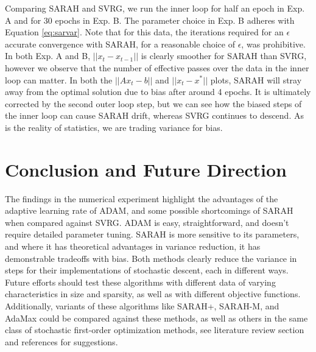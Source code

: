 \documentclass[letterpaper,11 pt]{article}
\begin{document}
Comparing SARAH and SVRG, we run the inner loop for half an epoch  in Exp. A and for 30 epochs in Exp. B.  The parameter choice in Exp. B adheres with Equation \ref{eq:sarvar}. Note that for this data, the iterations required for an $\epsilon$ accurate convergence with SARAH, for a reasonable choice of $\epsilon$, was prohibitive. In both Exp. A and B, $||x_t - x_{t-1}||$ is clearly smoother for SARAH than SVRG, however we observe that the number of effective passes over the data in the inner loop can matter. In both the $||Ax_t-b||$ and $||x_t-x^*||$ plots, SARAH will stray away from the optimal solution due to bias after around 4 epochs.  It is ultimately corrected by the second outer loop step, but we can see how the biased steps of the inner loop can cause SARAH drift, whereas SVRG continues to descend. As is the reality of statistics, we are trading variance for bias.


\section{Conclusion and Future Direction}
The findings in the numerical experiment highlight the advantages of the adaptive learning rate of ADAM, and some possible shortcomings of SARAH when compared against SVRG. ADAM is easy, straightforward, and doesn't require detailed parameter tuning. SARAH is more sensitive to its parameters, and where it has theoretical advantages in variance reduction, it has demonstrable tradeoffs with bias. Both methods clearly reduce the variance in steps for their implementations of stochastic descent, each in different ways.  Future efforts should test these algorithms with different data of varying characteristics in size and sparsity, as well as with different objective functions. Additionally, variants of these algorithms like SARAH+, SARAH-M, and AdaMax could be compared against these methods, as well as others in the same class of stochastic first-order optimization methods, see literature review section and references for suggestions.
\end{document}
